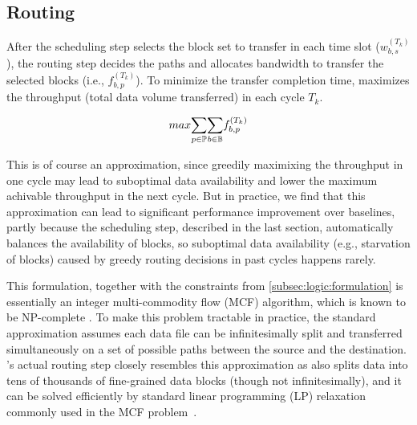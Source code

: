 

\subsection{Routing}
\label{subsec:logic:routing}

After the scheduling step selects the block set to transfer in each
time slot ($w^{(T_k)}_{b,s}$), the routing step decides the paths and
allocates bandwidth to transfer the selected blocks (i.e.,
$f_{b,p}^{(T_k)}$).
To minimize the transfer completion time, \name maximizes the
throughput (total data volume transferred) in each cycle $T_k$.

\begin{equation}
\centering
max \displaystyle{\sum_{p\in \mathbb{P}}}
\displaystyle{\sum_{b\in \mathbb{B}}}
f_{b,p}^{(T_k)}
\end{equation}

This is of course an approximation, since greedily maximixing the
throughput in one cycle may lead to suboptimal data availability and
lower the maximum achivable throughput in the next cycle. But in
practice, we find that this approximation can lead to significant
performance improvement over baselines, partly because the scheduling
step, described in the last section, automatically balances the
availability of blocks, so suboptimal data availability (e.g.,
starvation of blocks) caused by greedy routing decisions in past
cycles happens rarely.

This formulation, together with the constraints from
\Section\ref{subsec:logic:formulation} is essentially an integer
multi-commodity flow (MCF) algorithm, which is known to be
NP-complete \cite{garg1997primal}. To make this problem tractable in
practice, the standard approximation assumes each data file can be
infinitesimally split and transferred simultaneously on a set of
possible paths between the source and the destination. \name's actual
routing step closely resembles this approximation as \name also
splits data into tens of thousands of fine-grained data blocks
(though not infinitesimally), and it can be solved efficiently by
standard linear programming (LP) relaxation commonly used in the MCF
problem~\cite{garg2007faster,reed2012traffic}.

